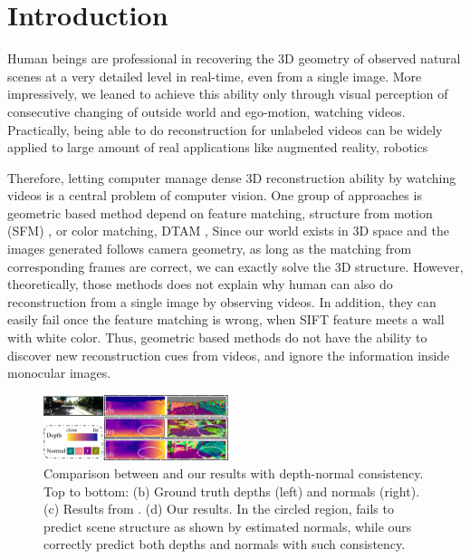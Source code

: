 
\vspace{-1.0\baselineskip}
\section{Introduction}
\label{sec:intro}
\vspace{-0.3\baselineskip}

Human beings are professional in recovering the 3D geometry of observed natural scenes at a very detailed level in real-time, even from a single image. 
More impressively, we leaned to achieve this ability only through visual perception of consecutive changing of outside world and ego-motion, \ie watching videos. 
Practically, being able to do reconstruction for unlabeled videos can be widely applied to large amount of real applications like augmented reality, robotics \etc

Therefore, letting computer manage dense 3D reconstruction ability by watching videos is a central problem of computer vision. 
One group of approaches is geometric based method depend on feature matching, \eg structure from motion (SFM) \cite{wu2011visualsfm} \etc, or color matching, \eg DTAM \cite{NewcombeLD11}, \etc  Since our world exists in 3D space and the images generated follows camera geometry, as long as the matching from corresponding frames are correct, we can exactly solve the 3D structure. 
However, theoretically, those methods does not explain why human can also do reconstruction from a single image by observing videos. In addition, they can easily fail once the feature matching is wrong, \eg when SIFT \cite{lowe2004distinctive}  feature meets a wall with white color. 
Thus, geometric based methods do not have the ability to discover new reconstruction cues from videos, and ignore the information inside monocular images.

\begin{figure}
\centering
\includegraphics[width=0.48\textwidth, height=0.18\textwidth]{figures/visual_comparison_comp-v2.pdf}
\caption{Comparison between \cite{zhou2017unsupervised} and our results with depth-normal consistency. Top to bottom: (b) Ground truth depths (left) and normals (right). (c) Results from \cite{zhou2017unsupervised}. (d) Our results. In the circled region, \cite{zhou2017unsupervised} fails to predict scene structure as shown by estimated normals, while ours correctly predict both depths and normals with such consistency.}
\vspace{-1.0\baselineskip}
\label{fig:visual_comparison}
\end{figure}

